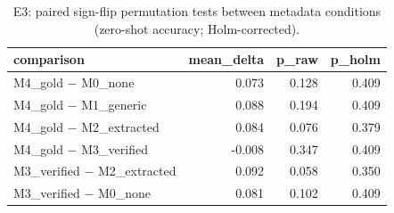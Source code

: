 \begin{table}
\caption{E3: paired sign-flip permutation tests between metadata conditions (zero-shot accuracy; Holm-corrected).}
\label{tab:T6_condition_tests}
\begin{tabular}{lrrr}
\toprule
comparison & mean\_delta & p\_raw & p\_holm \\
\midrule
M4\_gold − M0\_none & 0.073 & 0.128 & 0.409 \\
M4\_gold − M1\_generic & 0.088 & 0.194 & 0.409 \\
M4\_gold − M2\_extracted & 0.084 & 0.076 & 0.379 \\
M4\_gold − M3\_verified & -0.008 & 0.347 & 0.409 \\
M3\_verified − M2\_extracted & 0.092 & 0.058 & 0.350 \\
M3\_verified − M0\_none & 0.081 & 0.102 & 0.409 \\
\bottomrule
\end{tabular}
\end{table}
